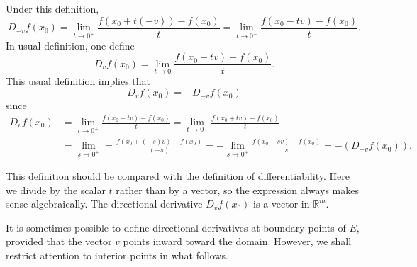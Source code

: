 \begin{remark}
    Under this definition, 
    \[
        D_{-v}f(x_0) = \lim_{t \to 0^+} \frac{f(x_0 + t(-v)) - f(x_0)}{t} = \lim_{t \to 0^+} \frac{f(x_0 - tv) - f(x_0)}{t}.
    \]
    In usual definition, one define 
    \[
        D_v f(x_0) = \lim_{t \to 0} \frac{f(x_0 + tv) - f(x_0)}{t}. 
    \]
    This usual definition implies that 
    \[
        D_v f(x_0) = -D_{-v} f(x_0)
    \]
    since 
    \begin{align*}
       D_v f(x_0) &= \lim_{t \to 0^+} \frac{f(x_0 + tv) - f(x_0)}{t} = \lim_{t \to 0^-} \frac{f(x_0 + tv) - f(x_0)}{t} \\
       &= \lim_{s \to 0^+} = \frac{f(x_0 + (-s) v) - f(x_0)}{(-s)} = -\lim_{s \to 0^+} \frac{f(x_0 - sv) - f(x_0)}{s} = -(D_{-v}f(x_0)).     
    \end{align*}
\end{remark}

\begin{remark}
    This definition should be compared with the definition of differentiability. Here we divide by the scalar \(t\) rather than by a vector, so the expression always makes sense algebraically. The directional derivative \(D_v f(x_0)\) is a vector in \(\mathbb{R} ^m\).   
\end{remark}

\begin{remark}
It is sometimes possible to define directional derivatives at boundary points of \(E\), provided that the vector \(v\)  points inward toward the domain. However, we shall restrict attention to interior points in what follows.
\end{remark}

